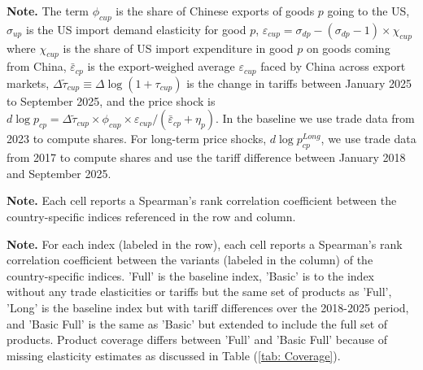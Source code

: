 \documentclass[english,12pt]{article}
\theoremstyle{definition}
\let\oldref\ref
\renewcommand{\ref}[1]{(\oldref{#1})}
\begin{document}
\begin{table}[H]
\begin{doublespace}
\begin{centering}
\caption{Price Shocks\label{tab: price_shocks}}
{\tiny{}}\vspace{0.25cm}
\par\end{centering}
\end{doublespace}
\raggedright{}{\footnotesize{}\textbf{Note.} The term $\phi_{cup}$ is the share of Chinese exports of goods $p$ going to the US, $\sigma_{up}$ is the US import demand elasticity for good $p$, $\varepsilon_{cup}=\sigma_{dp}-\left(\sigma_{dp}-1\right)\times\chi_{cup}$ where $\chi_{cup}$ is the share of US import expenditure in good $p$ on goods coming from China, $\bar{\varepsilon}_{cp}$ is the export-weighed average $\varepsilon_{cup}$ faced by China across export markets, $\Delta\tilde{\tau}_{cup}\equiv \Delta \log (1+\tau_{cup})$ is the change in tariffs between January 2025 to September 2025, and the price shock is $d\log p_{cp}=\Delta\tilde{\tau}_{cup}\times\phi_{cup}\times\varepsilon_{cup}/(\bar{\varepsilon}_{cp}+\eta_{p})$. In the baseline we use trade data from 2023 to compute shares. For long-term price shocks, $d\log p_{cp}^{Long}$, we use trade data from 2017 to compute shares and use the tariff difference between January 2018 and September 2025. }{\footnotesize\par}
\end{table}


\begin{table}[htbp]
\caption{Across-Index Rank Correlation}
\label{tab:rank_corr_across}\centering
\vspace{0.25cm}
\raggedright{}{\footnotesize{}\textbf{Note.} Each cell reports a Spearman's rank correlation coefficient between the country-specific indices referenced in the row and column.}{\footnotesize\par}
\end{table}

\begin{table}[htbp]
\caption{Within-Index Rank Correlation}
\label{tab:rank_corr_within}\centering
\vspace{0.25cm}
\raggedright{}{\footnotesize{}\textbf{Note.} For each index (labeled in the row), each cell reports a Spearman's rank correlation coefficient between the variants (labeled in the column) of the country-specific indices. 'Full' is the baseline index, 'Basic' is to the index without any trade elasticities or tariffs but the same set of products as 'Full', 'Long' is the baseline index but with tariff differences over the 2018-2025 period, and 'Basic Full' is the same as 'Basic' but extended to include the full set of products. Product coverage differs between 'Full' and 'Basic Full' because of missing elasticity estimates as discussed in Table \ref{tab: Coverage}.}{\footnotesize\par}
\end{table}
\end{document}
